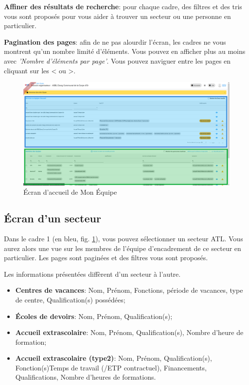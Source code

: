 \begin{info}
\textbf{Affiner des résultats de recherche}: pour chaque cadre, des filtres et des tris vous sont proposés pour vous aider à trouver un secteur ou une personne en particulier. 

\textbf{Pagination des pages}: afin de ne pas alourdir l'écran, les cadres ne vous montrent qu'un nombre limité d'éléments. Vous pouvez en afficher plus au moins avec \textit{'Nombre d'éléments par page'}. Vous pouvez naviguer entre les pages en cliquant sur les < ou >. 
\end{info} 


\begin{figure}
    \centering
    \includegraphics[width=16cm]{Images/team/accueil.png}
    \caption{Écran d'accueil de Mon Équipe}
    \label{fig:main_team}
\end{figure}

\subsection{Écran d'un secteur}\label{team_secteur}
Dans le cadre 1 (en bleu, fig. \ref{fig:main_team}), vous pouvez sélectionner un secteur ATL. Vous aurez alors une vue sur les membres de l'équipe d'encadrement de ce secteur en particulier. Les pages sont paginées et des filtres vous sont proposés. 

Les informations présentées diffèrent d'un secteur à l'autre. 

\begin{itemize}
    \item \textbf{Centres de vacances}: Nom, Prénom, Fonctions, période de vacances, type de centre, Qualification(s) possédées;
    \item \textbf{Écoles de devoirs}: Nom, Prénom, Qualification(s);
    \item \textbf{Accueil extrascolaire}: Nom, Prénom, Qualification(s), Nombre d'heure de formation;
    \item \textbf{Accueil extrascolaire (type2)}: Nom, Prénom, Qualification(s), Fonction(s)Temps de travail (/ETP contractuel),	Financements, Qualifications, Nombre d'heures de formations. 
\end{itemize}


